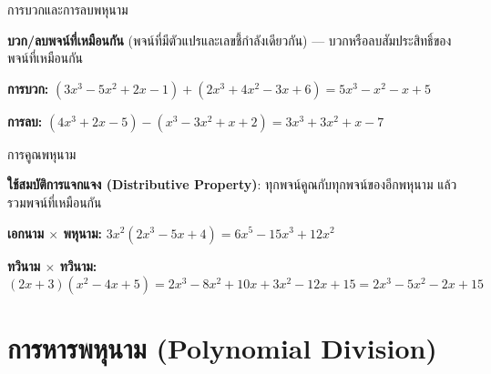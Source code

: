 \documentclass[11pt, aspectratio=169]{beamer}
\begin{document}
\begin{frame}{การบวกและการลบพหุนาม}
  \begin{explanation}[วิธีทำ]
    \textbf{บวก/ลบพจน์ที่เหมือนกัน} (พจน์ที่มีตัวแปรและเลขชี้กำลังเดียวกัน)
    — บวกหรือลบสัมประสิทธิ์ของพจน์ที่เหมือนกัน
  \end{explanation}

  \begin{exambox}[ตัวอย่าง]
    \textbf{การบวก:} $(3x^3 - 5x^2 + 2x - 1) + (2x^3 + 4x^2 - 3x + 6)
    = 5x^3 - x^2 - x + 5$

    \medskip
    \textbf{การลบ:} $(4x^3 + 2x - 5) - (x^3 - 3x^2 + x + 2)
    = 3x^3 + 3x^2 + x - 7$
  \end{exambox}
\end{frame}\begin{frame}{การคูณพหุนาม}
  \begin{explanation}[วิธีทำ]
    \textbf{ใช้สมบัติการแจกแจง (Distributive Property)}:
    ทุกพจน์คูณกับทุกพจน์ของอีกพหุนาม แล้วรวมพจน์ที่เหมือนกัน
  \end{explanation}

  \begin{exambox}[ตัวอย่าง]
    \textbf{เอกนาม $\times$ พหุนาม:}
    $3x^2(2x^3 - 5x + 4) = 6x^5 - 15x^3 + 12x^2$

    \medskip
    \textbf{ทวินาม $\times$ ทวินาม:}
    $(2x+3)(x^2-4x+5) = 2x^3 -8x^2 +10x +3x^2 -12x +15
    = 2x^3 -5x^2 -2x +15$
  \end{exambox}
\end{frame}

\section{การหารพหุนาม (Polynomial Division)}
\end{document}
